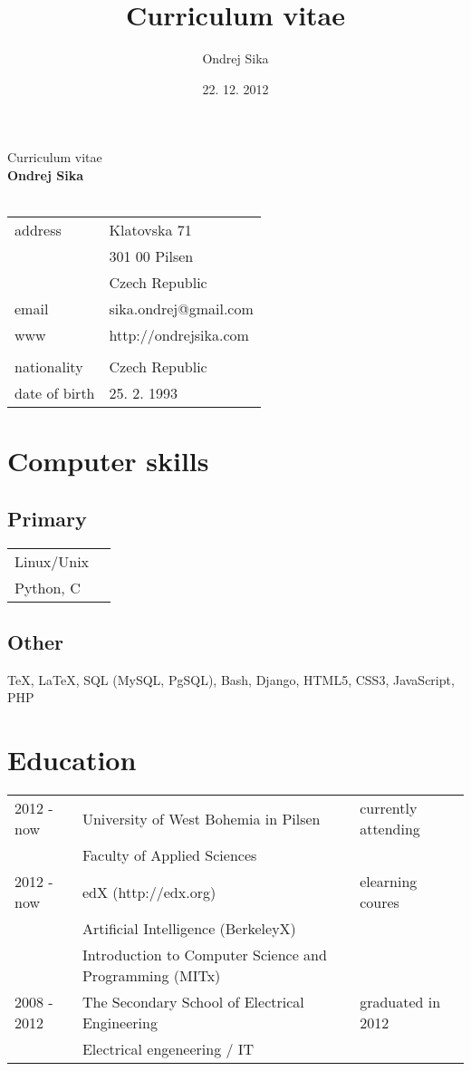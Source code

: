 \documentclass[12pt,a4paper]{article}
\title{Curriculum vitae}
\author{Ondrej Sika}
\date{22. 12. 2012}
\begin{document}
\begin{center}
{\Large Curriculum vitae}\\
\vspace*{1cm}
{\LARGE \bf Ondrej Sika}\\
\hrulefill\\
\vspace*{0.2cm}
\begin{tabular}{l l}
address & Klatovska 71\\
 & 301 00 Pilsen\\
 & Czech Republic\\
email & sika.ondrej@gmail.com\\
www & http://ondrejsika.com\\
\\
nationality & Czech Republic\\
date of birth & 25. 2. 1993\\
\end{tabular}
\end{center}

\section*{Computer skills}
\subsection*{Primary}
\begin{tabular}{@{}ll}
Linux/Unix & \\
Python, C & \\
\end{tabular}

\subsection*{Other}
TeX, LaTeX, SQL (MySQL, PgSQL), Bash, Django, HTML5, CSS3, JavaScript, PHP

\section*{Education}
\begin{tabular}{@{}p{2cm}ll}
2012 - now & University of West Bohemia in Pilsen  & currently attending\\
 & Faculty of Applied Sciences & \\
2012 - now & edX (http://edx.org) & elearning coures\\
 & Artificial Intelligence (BerkeleyX) & \\
 & Introduction to Computer Science and Programming (MITx) & \\
2008 - 2012 & The Secondary School of Electrical Engineering & graduated in 2012\\
 & Electrical engeneering / IT & \\
\end{tabular}
\end{document}
